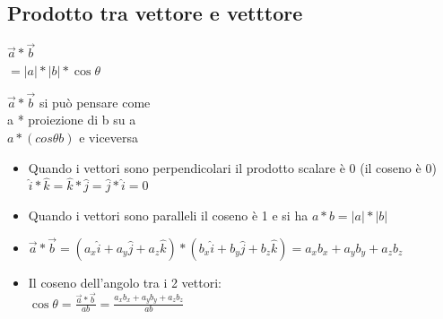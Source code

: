 \documentclass{report}
\begin{document}
\subsection{Prodotto tra vettore e vetttore}
$\vec{a}*\vec{b}$\\
$=|a|*|b|*\cos\theta$\\
\begin{figure}[!ht]
  \centering


\end{figure}
$\vec{a}*\vec{b}$ si può pensare come\\
a * proiezione di b su a\\
$a*(cos\theta b)$ e viceversa\\
\begin{itemize}
  \item Quando i vettori sono perpendicolari il prodotto scalare è 0 (il coseno è 0)\\$\hat{i}*\hat{k}=\hat{k}*\hat{j}=\hat{j}*\hat{i}=0$
  \item Quando i vettori sono paralleli il coseno è 1 e si ha $a*b=|a|*|b|$
  \item $\vec{a}*\vec{b}=(a_x\hat{i}+a_y\hat{j}+a_z\hat{k})*(b_x\hat{i}+b_y\hat{j}+b_z\hat{k})=a_xb_x+a_yb_y+a_zb_z$
  \item Il coseno dell'angolo tra i 2 vettori:\\$\cos\theta=\frac{\vec{a}*\vec{b}}{ab}=\frac{a_xb_x+a_yb_y+a_zb_z}{ab}$
\end{itemize}
\end{document}
